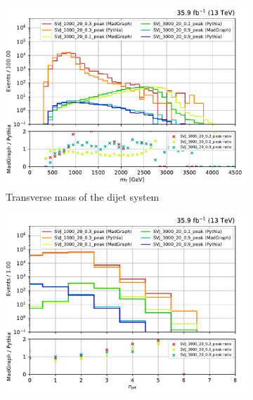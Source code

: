 \begin{figure}[htbp]
    \centering
    \begin{subfigure}[b]{0.48\textwidth}
        \includegraphics[width=\textwidth]{figures/madgraph_pythia_comparisons/plots/part1/dijet_mt.pdf}
        \caption{Transverse mass of the dijet system}
    \end{subfigure}
    \hfill
    \begin{subfigure}[b]{0.48\textwidth}
        \includegraphics[width=\textwidth]{figures/madgraph_pythia_comparisons/plots/part1/njet.pdf}
        \caption{\njet}
    \end{subfigure}


\end{figure}
